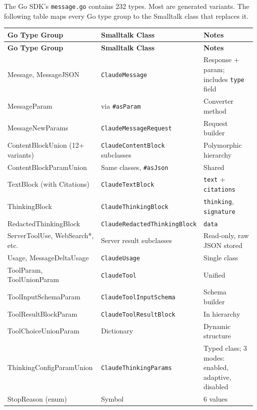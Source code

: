 \documentclass[a4paper,10pt,fleqn]{article}
\newcommand{\cls}[1]{\texttt{#1}}
\newcommand{\sel}[1]{\texttt{\##1}}
\begin{document}
The Go SDK's \texttt{message.go} contains 232 types.  Most are generated
variants.  The following table maps every Go type group to the Smalltalk
class that replaces it.

\begin{center}
\small
\begin{longtable}{@{}llp{4.5cm}@{}}
\toprule
\textbf{Go Type Group} & \textbf{Smalltalk Class} & \textbf{Notes} \\
\midrule
\endfirsthead
\toprule
\textbf{Go Type Group} & \textbf{Smalltalk Class} & \textbf{Notes} \\
\midrule
\endhead
Message, MessageJSON       & \cls{ClaudeMessage}        & Response + param;
  includes \texttt{type} field \\
MessageParam               & via \sel{asParam}          & Converter method \\
MessageNewParams           & \cls{ClaudeMessageRequest}  & Request builder \\
ContentBlockUnion (12+ variants) & \cls{ClaudeContentBlock} subclasses &
  Polymorphic hierarchy \\
ContentBlockParamUnion     & Same classes, \sel{asJson}  & Shared \\
TextBlock (with Citations) & \cls{ClaudeTextBlock}      & \texttt{text} +
  \texttt{citations} \\
ThinkingBlock              & \cls{ClaudeThinkingBlock}  & \texttt{thinking},
  \texttt{signature} \\
RedactedThinkingBlock      & \cls{ClaudeRedactedThinkingBlock} & \texttt{data} \\
ServerToolUse, WebSearch*, etc. & Server result subclasses & Read-only,
  raw JSON stored \\
Usage, MessageDeltaUsage   & \cls{ClaudeUsage}          & Single class \\
ToolParam, ToolUnionParam  & \cls{ClaudeTool}           & Unified \\
ToolInputSchemaParam       & \cls{ClaudeToolInputSchema} & Schema builder \\
ToolResultBlockParam       & \cls{ClaudeToolResultBlock} & In hierarchy \\
ToolChoiceUnionParam       & Dictionary                 & Dynamic structure \\
ThinkingConfigParamUnion   & \cls{ClaudeThinkingParams} & Typed class; 3 modes:
  enabled, adaptive, disabled \\
StopReason (enum)          & Symbol                     & 6 values \\

\end{longtable}
\end{center}
\end{document}
